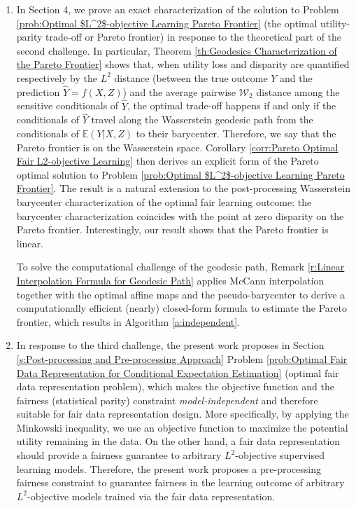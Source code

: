 \documentclass[twoside,11pt]{article}
\begin{document}
\begin{enumerate}
\item In Section 4, we prove an exact characterization of the solution to Problem \ref{prob:Optimal $L^2$-objective Learning Pareto Frontier} (the optimal utility-parity trade-off or Pareto frontier) in response to the theoretical part of the second challenge. In particular, Theorem \ref{th:Geodesics Characterization of the Pareto Frontier} shows that, when utility loss and disparity are quantified respectively by the $L^2$ distance (between the true outcome $Y$ and the prediction $\hat{Y} = f(X,Z)$) and the average pairwise $\mathcal{W}_2$ distance among the sensitive conditionals of $\hat{Y}$, the optimal trade-off happens if and only if the conditionals of $\hat{Y}$ travel along the Wasserstein geodesic path from the conditionals of $\mathbb{E}(Y|X,Z)$ to their barycenter. Therefore, we say that the Pareto frontier is on the Wasserstein space. Corollary \ref{corr:Pareto Optimal Fair L2-objective Learning} then derives an explicit form of the Pareto optimal solution to Problem \ref{prob:Optimal $L^2$-objective Learning Pareto Frontier}. The result is a natural extension to the post-processing Wasserstein barycenter characterization of the optimal fair learning outcome: the barycenter characterization coincides with the point at zero disparity on the Pareto frontier. Interestingly, our result shows that the Pareto frontier is linear.  

To solve the computational challenge of the geodesic path, Remark \ref{r:Linear Interpolation Formula for Geodesic Path} applies McCann interpolation together with the optimal affine maps and the pseudo-barycenter to derive a computationally efficient (nearly) closed-form formula to estimate the Pareto frontier, which results in Algorithm \ref{a:independent}.

\item In response to the third challenge, the present work proposes in Section \ref{s:Post-processing and Pre-processing Approach} Problem \ref{prob:Optimal Fair Data Representation for Conditional Expectation Estimation} (optimal fair data representation problem), which makes the objective function and the fairness (statistical parity) constraint {\em model-independent} and therefore suitable for fair data representation design. More specifically, by applying the Minkowski inequality, we use an objective function to maximize the potential utility remaining in the data. On the other hand, a fair data representation should provide a fairness guarantee to arbitrary $L^2$-objective supervised learning models. Therefore, the present work proposes a pre-processing fairness constraint to guarantee fairness in the learning outcome of arbitrary $L^2$-objective models trained via the fair data representation. 


\end{enumerate}
\end{document}
